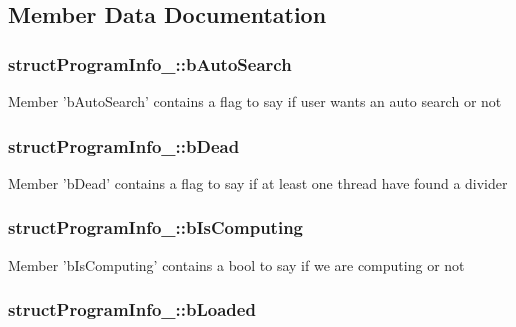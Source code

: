 \subsection{Member Data Documentation}
\hypertarget{structstructProgramInfo___a21c1f78042caa872eb641ab4fca44927}{
\subsubsection[{b\-Auto\-Search}]{\setlength{\rightskip}{0pt plus 5cm}struct\-Program\-Info\-\_\-\-::b\-Auto\-Search}}\label{structstructProgramInfo___a21c1f78042caa872eb641ab4fca44927}
Member 'b\-Auto\-Search' contains a flag to say if user wants an auto search or not \hypertarget{structstructProgramInfo___a9b7de95134debd4325e8a2f7f66bc302}{
\subsubsection[{b\-Dead}]{\setlength{\rightskip}{0pt plus 5cm}struct\-Program\-Info\-\_\-\-::b\-Dead}}\label{structstructProgramInfo___a9b7de95134debd4325e8a2f7f66bc302}
Member 'b\-Dead' contains a flag to say if at least one thread have found a divider \hypertarget{structstructProgramInfo___a88655ab266c8154f5f1c472a4894a4ed}{
\subsubsection[{b\-Is\-Computing}]{\setlength{\rightskip}{0pt plus 5cm}struct\-Program\-Info\-\_\-\-::b\-Is\-Computing}}\label{structstructProgramInfo___a88655ab266c8154f5f1c472a4894a4ed}
Member 'b\-Is\-Computing' contains a bool to say if we are computing or not \hypertarget{structstructProgramInfo___a5af2eea5747632af7dd813fc09c1b13e}{
\subsubsection[{b\-Loaded}]{\setlength{\rightskip}{0pt plus 5cm}struct\-Program\-Info\-\_\-\-::b\-Loaded}}\label{structstructProgramInfo___a5af2eea5747632af7dd813fc09c1b13e}
